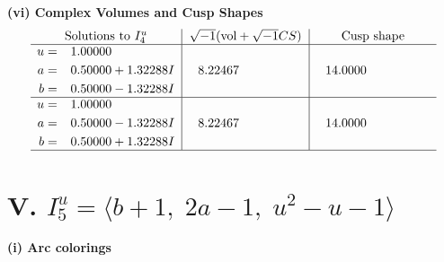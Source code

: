 \documentclass[1p]{elsarticle_modified}
\theoremstyle{definition}
\newcommand{\I}{\sqrt{-1}}
\begin{document}
\newpage\flushleft \textbf{(vi) Complex Volumes and Cusp Shapes}
$$\begin{array}{c|c|c}  
\text{Solutions to }I^u_{4}& \I (\text{vol} + \sqrt{-1}CS) & \text{Cusp shape}\\
 \hline 
\begin{aligned}
u &= \phantom{-}1.00000\phantom{ +0.000000I} \\
a &= \phantom{-}0.50000 + 1.32288 I \\
b &= \phantom{-}0.50000 - 1.32288 I\end{aligned}
 & \phantom{-}8.22467\phantom{ +0.000000I} & \phantom{-}14.0000\phantom{ +0.000000I} \\ \hline\begin{aligned}
u &= \phantom{-}1.00000\phantom{ +0.000000I} \\
a &= \phantom{-}0.50000 - 1.32288 I \\
b &= \phantom{-}0.50000 + 1.32288 I\end{aligned}
 & \phantom{-}8.22467\phantom{ +0.000000I} & \phantom{-}14.0000\phantom{ +0.000000I}\\
 \hline 
 \end{array}$$\newpage\newpage\renewcommand{\arraystretch}{1}
\centering \section*{V. $I^u_{5}= \langle b+1,\;2 a-1,\;u^2- u-1 \rangle$}
\flushleft \textbf{(i) Arc colorings}\\
\end{document}
